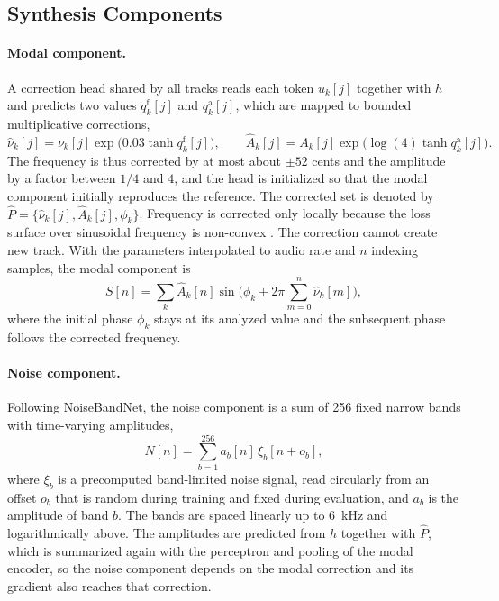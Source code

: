 \subsection{Synthesis Components}
\label{sec:method-synthesis}
\paragraph{Modal component.}
A correction head shared by all tracks reads each token $u_k[j]$ together with $h$ and predicts two values $q^{\mathrm{f}}_k[j]$ and $q^{\mathrm{a}}_k[j]$, which are mapped to bounded multiplicative corrections,
\begin{equation}
\hat{\nu}_k[j]=\nu_k[j]\exp\!\big(0.03\tanh q^{\mathrm{f}}_k[j]\big),\qquad
\hat{A}_k[j]=A_k[j]\exp\!\big(\log(4)\tanh q^{\mathrm{a}}_k[j]\big).
\label{eq:modal-correction}
\end{equation}
The frequency is thus corrected by at most about $\pm 52$ cents and the amplitude by a factor between $1/4$ and $4$, and the head is initialized so that the modal component initially reproduces the reference.
The corrected set is denoted by $\hat{P}=\{\hat{\nu}_k[j], \hat{A}_k[j], \phi_k\}$.
Frequency is corrected only locally because the loss surface over sinusoidal frequency is non-convex \citep{hayes2023sinusoidal}.
The correction cannot create new track.
With the parameters interpolated to audio rate and $n$ indexing samples, the modal component is
\begin{equation}
S[n]=\sum_{k}\hat{A}_k[n]\sin\!\Big(\phi_k+2\pi\sum_{m=0}^{n}\hat{\nu}_k[m]\Big),
\label{eq:modal-synth}
\end{equation}
where the initial phase $\phi_k$ stays at its analyzed value and the subsequent phase follows the corrected frequency.

\paragraph{Noise component.}
Following NoiseBandNet, the noise component is a sum of 256 fixed narrow bands with time-varying amplitudes,
\begin{equation}
N[n]=\sum_{b=1}^{256} a_b[n]\,\xi_b[n+o_b],
\label{eq:noise}
\end{equation}
where $\xi_b$ is a precomputed band-limited noise signal, read circularly from an offset $o_b$ that is random during training and fixed during evaluation, and $a_b$ is the amplitude of band $b$.
The bands are spaced linearly up to 6~kHz and logarithmically above.
The amplitudes are predicted from $h$ together with $\hat{P}$, which is summarized again with the perceptron and pooling of the modal encoder, so the noise component depends on the modal correction and its gradient also reaches that correction.

